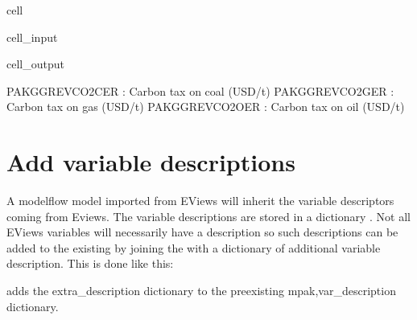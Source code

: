 \documentclass[letterpaper,10pt,english]{jupyterBook}
\begin{document}
\begin{sphinxuseclass}{cell}\begin{sphinxVerbatimInput}

\begin{sphinxuseclass}{cell_input}
\begin{sphinxVerbatim}[commandchars=\\\{\}]
\PYG{p}{[}\PYG{p}{]}
\end{sphinxVerbatim}

\end{sphinxuseclass}\end{sphinxVerbatimInput}
\begin{sphinxVerbatimOutput}

\begin{sphinxuseclass}{cell_output}
\begin{sphinxVerbatim}[commandchars=\\\{\}]
PAKGGREVCO2CER : Carbon tax on coal (USD/t)
PAKGGREVCO2GER : Carbon tax on gas (USD/t)
PAKGGREVCO2OER : Carbon tax on oil (USD/t)
\end{sphinxVerbatim}

\end{sphinxuseclass}\end{sphinxVerbatimOutput}

\end{sphinxuseclass}

\section{Add variable descriptions}
\label{\detokenize{content/05_WBModels/MoreComplexScenarios:add-variable-descriptions}}
\sphinxAtStartPar
A modelflow model imported from EViews will inherit the variable descriptors coming from Eviews.  The variable descriptions are stored in a dictionary . Not all EViews variables will necessarily have a description so such descriptions can be added to the existing by joining the  with a dictionary of additional variable description. This is done like this:

\sphinxAtStartPar
{}

\sphinxAtStartPar
adds the extra\_description dictionary to the pre\sphinxhyphen{}existing mpak,var\_description dictionary.
\end{document}
